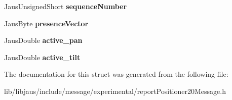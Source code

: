 \begin{DoxyCompactItemize}
\item 
\hypertarget{struct_report_positioner20_message_struct_ad3c5ca3fc5b52b8d5288527a7dc583dc}{\-Jaus\-Unsigned\-Short {\bfseries sequence\-Number}}\label{struct_report_positioner20_message_struct_ad3c5ca3fc5b52b8d5288527a7dc583dc}

\item 
\hypertarget{struct_report_positioner20_message_struct_a2865713a9f53256bbca3e83abb998976}{\-Jaus\-Byte {\bfseries presence\-Vector}}\label{struct_report_positioner20_message_struct_a2865713a9f53256bbca3e83abb998976}

\item 
\hypertarget{struct_report_positioner20_message_struct_a5e2c49ca2a83b885c8f3c044949013b3}{\-Jaus\-Double {\bfseries active\-\_\-pan}}\label{struct_report_positioner20_message_struct_a5e2c49ca2a83b885c8f3c044949013b3}

\item 
\hypertarget{struct_report_positioner20_message_struct_a505889a948ef9ebdb7923cfc2963629a}{\-Jaus\-Double {\bfseries active\-\_\-tilt}}\label{struct_report_positioner20_message_struct_a505889a948ef9ebdb7923cfc2963629a}

\end{DoxyCompactItemize}


\-The documentation for this struct was generated from the following file\-:\begin{DoxyCompactItemize}
\item 
lib/libjaus/include/message/experimental/report\-Positioner20\-Message.\-h\end{DoxyCompactItemize}
